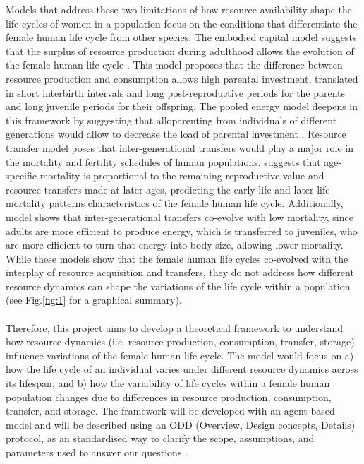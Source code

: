 \documentclass{article}
\begin{document}
Models that address these two limitations of how resource availability shape the life cycles of women in a population focus on the conditions that differentiate the female human life cycle from other species. The embodied capital model suggests that the surplus of resource production during adulthood allows the evolution of the female human life cycle \citep{kaplan2000theory}. This model proposes that the difference between resource production and consumption allows high parental investment, translated in short interbirth intervals and long post-reproductive periods for the parents and long juvenile periods for their offspring. The pooled energy model deepens in this framework by suggesting that alloparenting from individuals of different generations would allow to decrease the load of parental investment \citep{kramer2010pooled}. Resource transfer model poses that inter-generational transfers would play a major role in the mortality and fertility schedules of human populations. \cite{lee2003rethinking} suggests that age-specific mortality is proportional to the remaining reproductive value and resource transfers made at later ages, predicting the early-life and later-life mortality patterns characteristics of the female human life cycle. Additionally, \cite{chu2006co} model shows that inter-generational transfers co-evolve with low mortality, since adults are more efficient to produce energy, which is transferred to juveniles, who are more efficient to turn that energy into body size, allowing lower mortality. While these models show that the female human life cycles co-evolved with the interplay of resource acquisition and transfers, they do not address how different resource dynamics can shape the variations of the life cycle within a population (see Fig.\ref{fig:1} for a graphical summary).
\\\\
Therefore, this project aims to develop a theoretical framework to understand how resource dynamics (i.e. resource production, consumption, transfer, storage) influence variations of the female human life cycle. The model would focus on a) how the life cycle of an individual varies under different resource dynamics across its lifespan, and b) how the variability of life cycles within a female human population changes due to differences in resource production, consumption, transfer, and storage. The framework will be developed with an agent-based model and will be described using an ODD (Overview, Design concepts, Details) protocol, as an standardised way to clarify the scope, assumptions, and parameters used to answer our questions \citep{grimm2006standard,grimm2020odd}.
\end{document}
